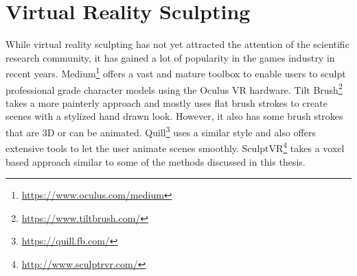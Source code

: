 \section{Virtual Reality Sculpting}

While virtual reality sculpting has not yet attracted the attention of the scientific research community, it has gained a lot of popularity in the games industry in recent years.
Medium\footnote{\url{https://www.oculus.com/medium}} offers a vast and mature toolbox to enable users to sculpt professional grade character models using the Oculus VR hardware.
Tilt Brush\footnote{\url{https://www.tiltbrush.com/}} takes a more painterly approach and mostly uses flat brush strokes to create scenes with a stylized hand drawn look. However, it also has some brush strokes that are 3D or can be animated. Quill\footnote{\url{https://quill.fb.com/}} uses a similar style and also offers extensive tools to let the user animate scenes smoothly. SculptVR\footnote{\url{http://www.sculptrvr.com/}} takes a voxel based approach similar to some of the methods discussed in this thesis.

